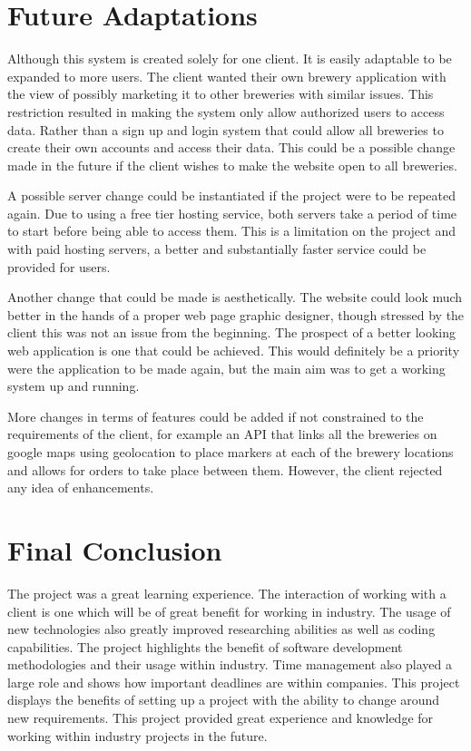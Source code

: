 \section{Future Adaptations}
Although this system is created solely for one client. It is easily adaptable to be expanded to more users. The client wanted their own brewery application with the view of possibly marketing it to other breweries with similar issues. This restriction resulted in making the system only allow authorized users to access data. Rather than a sign up and login system that could allow all breweries to create their own accounts and access their data. This could be a possible change made in the future if the client wishes to make the website open to all breweries. \par
A possible server change could be instantiated if the project were to be repeated again. Due to using a free tier hosting service, both servers take a period of time to start before being able to access them. This is a limitation on the project and with paid hosting servers, a better and substantially faster service could be provided for users.\par
Another change that could be made is aesthetically. The website could look much better in the hands of a proper web page graphic designer, though stressed by the client this was not an issue from the beginning. The prospect of a better looking web application is one that could be achieved. This would definitely be a priority were the application to be made again, but the main aim was to get a working system up and running.\par
More changes in terms of features could be added if not constrained to the requirements of the client, for example an API that links all the breweries on google maps using geolocation to place markers at each of the brewery locations and allows for orders to take place between them. However, the client rejected any idea of enhancements.

\section{Final Conclusion}
The project was a great learning experience. The interaction of working with a client is one which will be of great benefit for working in industry. The usage of new technologies also greatly improved researching abilities as well as coding capabilities. The project highlights the benefit of software development methodologies and their usage within industry. Time management also played a large role and shows how important deadlines are within companies. This project displays the benefits of setting up a project with the ability to change around new requirements. This project provided great experience and knowledge for working within industry projects in the future.